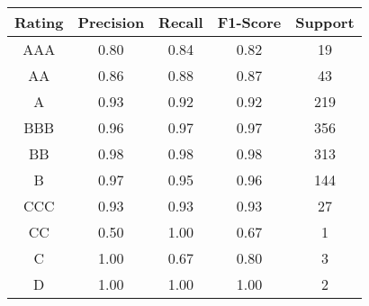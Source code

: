 \small
\begin{tabular}{ccccc}
\toprule
Rating & Precision & Recall & F1-Score & Support \\
\midrule
AAA & 0.80 & 0.84 & 0.82 & 19 \\
AA & 0.86 & 0.88 & 0.87 & 43 \\
A & 0.93 & 0.92 & 0.92 & 219 \\
BBB & 0.96 & 0.97 & 0.97 & 356 \\
BB & 0.98 & 0.98 & 0.98 & 313 \\
B & 0.97 & 0.95 & 0.96 & 144 \\
CCC & 0.93 & 0.93 & 0.93 & 27 \\
CC & 0.50 & 1.00 & 0.67 & 1 \\
C & 1.00 & 0.67 & 0.80 & 3 \\
D & 1.00 & 1.00 & 1.00 & 2 \\
\bottomrule
\end{tabular}

\normalsize